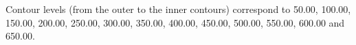 Contour levels (from the outer to the inner contours) correspond to 50.00, 100.00, 150.00, 200.00, 250.00, 300.00, 350.00, 400.00, 450.00, 500.00, 550.00, 600.00 and 650.00.
